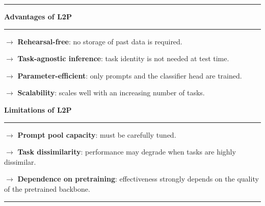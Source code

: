 \begin{center}
    \hrule
    \vspace{0.3cm}
    
    \begin{minipage}[t]{0.47\textwidth}
    \centering
    \textbf{Advantages of L2P}
    
    \vspace{0.2cm}
    \hrule
    \vspace{0.2cm}
    
    $\rightarrow$ \textbf{Rehearsal-free}: no storage of past data is required.
    
    \vspace{0.15cm}
    
    $\rightarrow$ \textbf{Task-agnostic inference}: task identity is not needed at test time.
    
    \vspace{0.15cm}
    
    $\rightarrow$ \textbf{Parameter-efficient}: only prompts and the classifier head are
    trained.
    
    \vspace{0.15cm}
    
    $\rightarrow$ \textbf{Scalability}: scales well with an increasing number of tasks.
    
    \end{minipage}
    \hfill
    \begin{minipage}[t]{0.47\textwidth}
    \centering
    \textbf{Limitations of L2P}
    
    \vspace{0.2cm}
    \hrule
    \vspace{0.2cm}
    
    $\rightarrow$ \textbf{Prompt pool capacity}: must be carefully tuned.
    
    \vspace{0.15cm}
    
    $\rightarrow$ \textbf{Task dissimilarity}: performance may degrade when tasks are highly
    dissimilar.
    
    \vspace{0.15cm}
    
    $\rightarrow$ \textbf{Dependence on pretraining}: effectiveness strongly depends on the
    quality of the pretrained backbone.
    
    \end{minipage}
    
    \vspace{0.3cm}
\hrule
\end{center}

